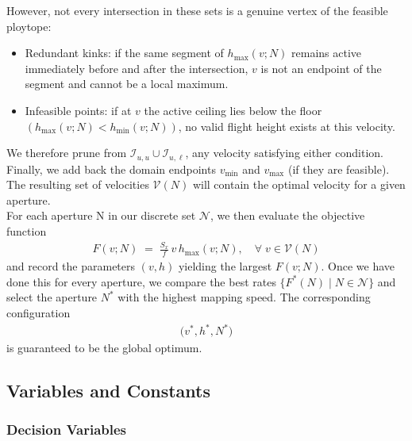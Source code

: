 \documentclass[11pt]{article}
\begin{document}
However, not every intersection in these sets is a genuine vertex of the feasible ploytope:
\begin{itemize}
  \item Redundant kinks: if the same segment of $h_{\max}(v;N)$ remains active immediately before and after the intersection, $v$ is not an endpoint of the segment and cannot be a local maximum. 
  \item Infeasible points: if at $v$ the active ceiling lies below the floor $(h_{\max}(v;N)<h_{\min}(v;N))$, no valid flight height exists at this velocity.
\end{itemize}

We therefore prune from $\mathcal I_{u,u} \cup \mathcal I_{u,\ell}$, any velocity satisfying either condition. Finally, we add back the domain endpoints $v_{\min}$ and $v_{\max}$ (if they are feasible). The resulting set of velocities $\mathcal{V}(N)$ will contain the optimal velocity for a given aperture.\\

For each aperture N in our discrete set $\mathcal N$, we then evaluate the objective function
\begin{align}
  F(v;N)\;=\;\frac{S_x}{f}\,v\,h_{\max}(v;N), \quad \forall \; v\in\mathcal V(N)
\end{align}
and record the parameters $(v,h)$ yielding the largest $F(v;N)$. Once we have done this for every aperture, we compare the best rates $\{F^*(N)\mid N\in\mathcal N\}$ and select the aperture $N^*$ with the highest mapping speed. The corresponding configuration
\begin{align}
  \bigl(v^*,h^*,N^*\bigr)
\end{align}
is guaranteed to be the global optimum.





















\newpage
\subsection{Variables and Constants}

\subsubsection{Decision Variables}
\end{document}
